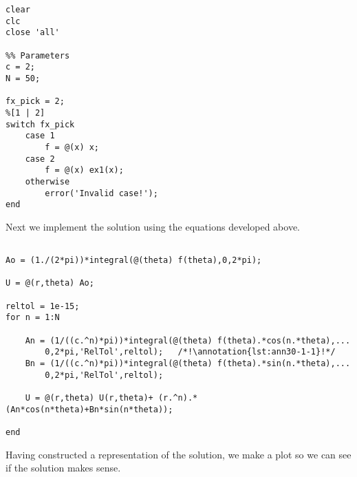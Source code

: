 \begin{lstlisting}[name=lec30-ex1, style=myMatlab]
clear
clc
close 'all'

%% Parameters
c = 2;
N = 50;

fx_pick = 2;
%[1 | 2]
switch fx_pick
    case 1
        f = @(x) x;
    case 2
        f = @(x) ex1(x);
    otherwise
        error('Invalid case!');    
end

\end{lstlisting}

Next we implement the solution using the equations developed above.

\begin{lstlisting}[name=lec30-ex1,style=myMatlab]
%% solve the problem

Ao = (1./(2*pi))*integral(@(theta) f(theta),0,2*pi);

U = @(r,theta) Ao;

reltol = 1e-15;
for n = 1:N
   
    An = (1/((c.^n)*pi))*integral(@(theta) f(theta).*cos(n.*theta),...
        0,2*pi,'RelTol',reltol);   /*!\annotation{lst:ann30-1-1}!*/
    Bn = (1/((c.^n)*pi))*integral(@(theta) f(theta).*sin(n.*theta),...
        0,2*pi,'RelTol',reltol);  
   
    U = @(r,theta) U(r,theta)+ (r.^n).*(An*cos(n*theta)+Bn*sin(n*theta));
    
end
\end{lstlisting}
Having constructed a representation of the solution, we make a plot so we can see if the solution makes sense.

